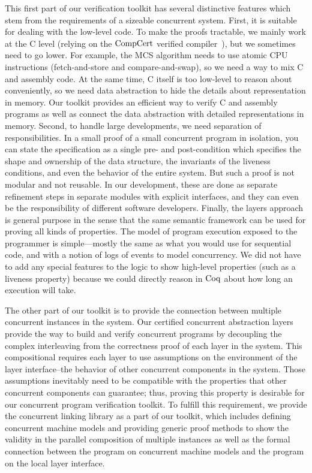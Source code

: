 This first part of our verification toolkit has several distinctive features which stem from the requirements of 
a sizeable concurrent system. First, it is suitable for dealing with the low-level code. To make the proofs tractable, 
we mainly work at the C level (relying on the $\mathrm{CompCert}$ verified compiler~\cite{compcert}), 
but we sometimes need to go lower. 
For example, the MCS algorithm needs to use atomic CPU instructions (fetch-and-store and compare-and-swap), 
so we need a way to mix C and assembly code. At the same time, C itself is too low-level to reason about conveniently, 
so we need data abstraction to hide the details about representation in memory. 
Our toolkit provides an efficient way to verify C and assembly programs as well as connect the data abstraction 
with detailed representations in memory. Second, to handle large developments, we need separation of responsibilities. 
In a small proof of a small concurrent program in isolation, 
you can state the specification as a single pre- and post-condition which specifies the shape and ownership of the data structure, 
the invariants of the liveness conditions, and even the behavior of the entire system. 
But such a proof is not modular and not reusable. In our development, 
these are done as separate refinement steps in separate modules with explicit interfaces, 
and they can even be the responsibility of different software developers. 
Finally, the layers approach is general purpose in the sense that the same semantic framework can be used for proving all kinds of properties. 
The model of program execution exposed to the programmer is simple—mostly the same as what you would use for sequential code, 
and with a notion of logs of events to model concurrency. We did not have to add any special features to the logic to show high-level 
properties (such as a liveness property) because we could directly reason in $\mathrm{Coq}$ about how long an execution will take.

The other part of our toolkit is to provide the connection between multiple concurrent instances in the system. 
Our certified concurrent abstraction layers provide the way to build and verify concurrent programs by decoupling 
the complex interleaving from the correctness proof of each layer in the system. 
This compositional requires each layer to use assumptions on the environment of the layer interface--the behavior of other concurrent components 
in the system. 
Those assumptions inevitably need to be compatible with the properties that other concurrent components can guarantee; 
thus, proving this property is desirable for our concurrent program verification toolkit. To fulfill this requirement, 
we provide the concurrent linking library as a part of our toolkit, which includes defining concurrent machine 
models and providing generic proof methods to show the validity in the parallel composition of multiple instances as well as 
the formal connection between the program on concurrent machine models and the program on the local layer interface.

